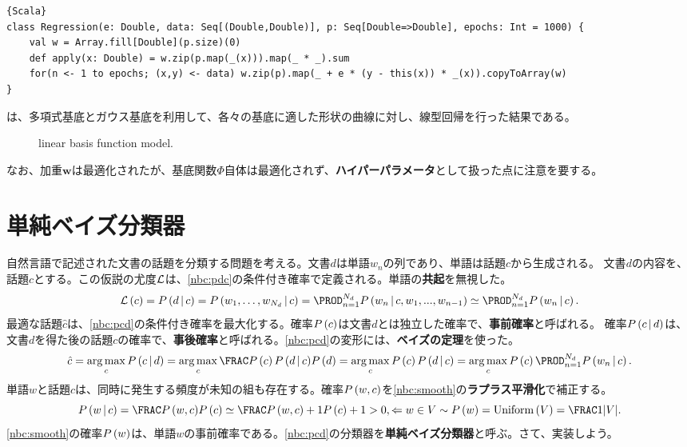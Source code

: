 \documentclass[10pt,a4paper]{book}
\begin{document}
\begin{Verbatim}{Scala}
class Regression(e: Double, data: Seq[(Double,Double)], p: Seq[Double=>Double], epochs: Int = 1000) {
	val w = Array.fill[Double](p.size)(0)
	def apply(x: Double) = w.zip(p.map(_(x))).map(_ * _).sum
	for(n <- 1 to epochs; (x,y) <- data) w.zip(p).map(_ + e * (y - this(x)) * _(x)).copyToArray(w)
}
\end{Verbatim}

は、多項式基底とガウス基底を利用して、各々の基底に適した形状の曲線に対し、線型回帰を行った結果である。

\begin{figure}[h]
\centering
{}
\caption{linear basis function model.\label{fig:lbf}}
\end{figure}

なお、加重$\bm{w}$は最適化されたが、基底関数$\Phi$自体は最適化されず、\textbf{ハイパーパラメータ}として扱った点に注意を要する。

\section{単純ベイズ分類器}

自然言語で記述された文書の話題を分類する問題を考える。文書$d$は単語$w_n$の列であり、単語は話題$c$から生成される。
文書$d$の内容を、話題$c$とする。この仮説の尤度$\mathcal{L}$は、\eqref{nbc:pdc}の条件付き確率で定義される。単語の\textbf{共起}を無視した。
%
\begin{equation}
\label{eq:nbc:pdc}
\Lk{c} =
\Prob{d}[c] =
\Prob{w_1,\dots,w_{N_d}}[c] =
\prod_{n=1}^{N_d} \Prob{w_n}[c,w_1,...,w_{n-1}] \simeq
\prod_{n=1}^{N_d} \Prob{w_n}[c].
\end{equation}
%
最適な話題$\hat{c}$は、\eqref{nbc:pcd}の条件付き確率を最大化する。確率$\Prob{c}$は文書$d$とは独立した確率で、\textbf{事前確率}と呼ばれる。
確率$\Prob{c}[d]$は、文書$d$を得た後の話題$c$の確率で、\textbf{事後確率}と呼ばれる。\eqref{nbc:pcd}の変形には、\textbf{ベイズの定理}を使った。
%
\begin{equation}
\label{eq:nbc:pcd}
\hat{c} =
\argmax_c \Prob{c}[d] =
\argmax_c \frac{\Prob{c}\Prob{d}[c]}{\Prob{d}} =
\argmax_c \Prob{c}\Prob{d}[c] =
\argmax_c \Prob{c} \prod_{n=1}^{N_d} \Prob{w_n}[c].
\end{equation}
%
単語$w$と話題$c$は、同時に発生する頻度が未知の組も存在する。確率$\Prob{w,c}$を\eqref{nbc:smooth}の\textbf{ラプラス平滑化}で補正する。
%
\begin{equation}
\label{eq:nbc:smooth}
\Prob{w}[c] =
\frac{\Prob{w,c}}{\Prob{c}} \simeq
\frac{\Prob{w,c}+1}{\Prob{c}+1} > 0,
\Leftarrow w \in V \sim \Prob{w} = \Ud{V} = \frac{1}{\abs{V}}.
\end{equation}
%
\eqref{nbc:smooth}の確率$\Prob{w}$は、単語$w$の事前確率である。\eqref{nbc:pcd}の分類器を\textbf{単純ベイズ分類器}と呼ぶ。さて、実装しよう。
\end{document}
